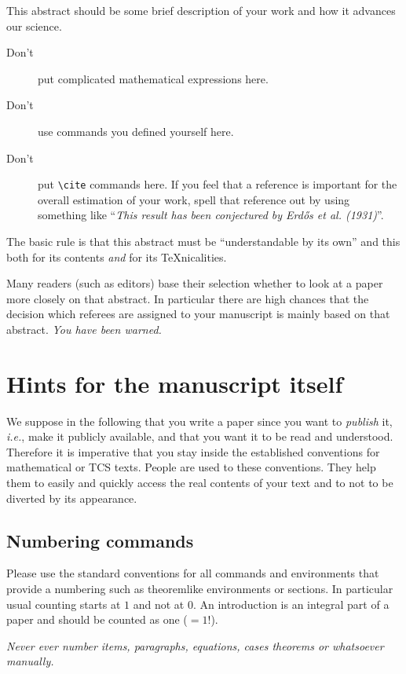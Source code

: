 \documentclass[
submission
]{dmtcs-episciences}
\begin{document}
\begin{itemize}
  This abstract should be some brief description of
  your work and how it advances our science.
  \begin{description}
  \item[Don't] put complicated mathematical expressions here.
  \item[Don't] use commands you defined yourself here.
  \item[Don't] put \verb!\cite! commands here. If you feel that a
    reference is important for the overall estimation of your work,
    spell that reference out by using something like
    ``\emph{This result has been conjectured by Erd\H{o}s et al. (1931)}''.
  \end{description}
  The basic rule is that this abstract must be ``understandable by its
  own'' and this both for its contents \emph{and} for its
  TeXnicalities.

  Many readers (such as editors) base their selection whether to look
  at a paper more closely on that abstract. In particular there are
  high chances that the decision which referees are assigned to your
  manuscript is mainly based on that abstract. \emph{You have been
    warned.}
\end{itemize}


\section{Hints for the manuscript itself}
\label{sec:hints}
We suppose in the following that you write a paper since you want to
\emph{publish} it, \textit{i.e.}, make it publicly available, and
that you want it to be read and understood. Therefore it is imperative
that you stay inside the established conventions for mathematical or
TCS texts. People are used to these conventions.  They help them to
easily and quickly access the real contents of your text and to not to
be diverted by its appearance.

\subsection{Numbering commands}
\label{sec:numbering}

Please use the standard conventions for all commands and environments
that provide a numbering such as theoremlike environments or sections.
In particular usual counting starts at $1$ and not at $0$. An
introduction is an integral part of a paper and should be counted as
one ($=1$!).

\begin{center}
  \emph{Never ever number items, paragraphs, equations, cases theorems
    or whatsoever manually.}
\end{center}
\end{document}
